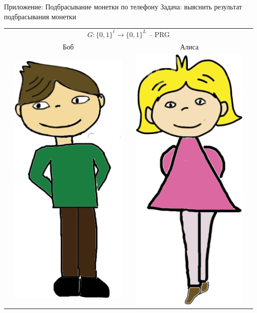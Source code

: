 \documentclass[usenames,dvipsnames,8pt,aspectratio=169]{beamer}
\begin{document}
\begin{frame}{Приложение: Подбрасывание монетки по телефону}
\LARGE
Задача:  выяснить результат подбрасывания монетки
\begin{center}
	\begin{tabular}{c c c c c}
		 \multicolumn{5}{c}{$G: \{0,1\}^{\ell} \rightarrow \{0,1\}^{L}$ -- PRG}\\[10pt]
		& Боб  & & Алиса &  \\
		 & \multirow{5}{*}{\includegraphics[scale=0.20]{Bob}} & &
		\multirow{5}{*}{\includegraphics[scale=0.20]{Alice}} &  \\

\end{tabular}
\end{center}
\end{frame}
\end{document}
